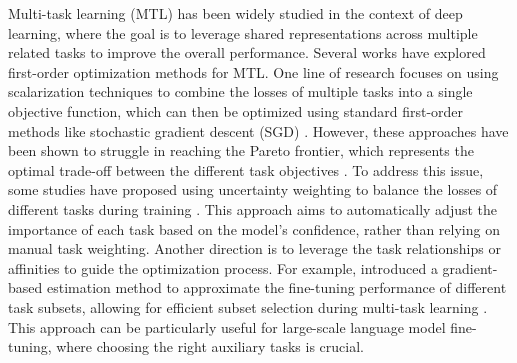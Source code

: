 Multi-task learning (MTL) has been widely studied in the context of deep learning, where the goal is to leverage shared representations across multiple related tasks to improve the overall performance. Several works have explored first-order optimization methods for MTL.
One line of research focuses on using scalarization techniques to combine the losses of multiple tasks into a single objective function, which can then be optimized using standard first-order methods like stochastic gradient descent (SGD) \citep{hu2024revisiting}. However, these approaches have been shown to struggle in reaching the Pareto frontier, which represents the optimal trade-off between the different task objectives .
To address this issue, some studies have proposed using uncertainty weighting to balance the losses of different tasks during training \citep{xin2022current}. This approach aims to automatically adjust the importance of each task based on the model's confidence, rather than relying on manual task weighting.
Another direction is to leverage the task relationships or affinities to guide the optimization process. For example, \citet{li2024scalable} introduced a gradient-based estimation method to approximate the fine-tuning performance of different task subsets, allowing for efficient subset selection during multi-task learning \citep{samant2022framework}. This approach can be particularly useful for large-scale language model fine-tuning, where choosing the right auxiliary tasks is crucial.
